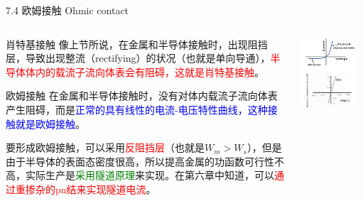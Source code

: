 \documentclass[10pt,aspectratio=43,mathserif]{beamer}
\begin{document}
\begin{frame}{7.4 欧姆接触 Ohmic contact}
	\begin{columns}
		\begin{column}{0.6\textwidth}
			\small
			\begin{block}{肖特基接触}
				像上节所说，在金属和半导体接触时，出现阻挡层，导致出现整流（rectifying）的状况（也就是单向导通），\textcolor{red}{半导体体内的载流子流向体表会有阻碍，这就是肖特基接触}。
			\end{block}
			
			\begin{block}{欧姆接触}
				在金属和半导体接触时，没有对体内载流子流向体表产生阻碍，而是\textcolor{blue}{正常的具有线性的电流-电压特性曲线，这种接触就是欧姆接触}。
				
				要形成欧姆接触，可以采用\textcolor{red}{反阻挡层}（也就是$W_m>W_s$），但是由于半导体的表面态密度很高，所以提高金属的功函数可行性不高，实际生产是\textcolor{green}{采用隧道原理}来实现。在第六章中知道，可以\textcolor{red}{通过重掺杂的pn结来实现隧道电流}。
			\end{block}
		\end{column}
		\begin{column}{0.4\textwidth}
			\includegraphics[width=0.9\textwidth]{ohmic_contacts.png}
		\end{column}
	\end{columns}
\end{frame}
\end{document}
